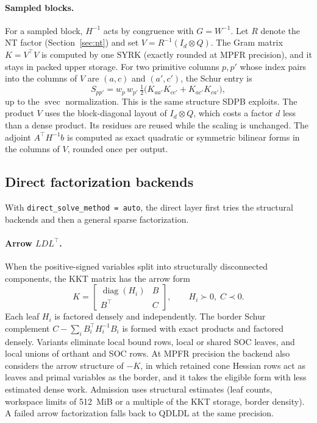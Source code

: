 \documentclass[11pt]{article}
\newcommand{\svec}{\operatorname{svec}}
\newcommand{\code}[1]{\texttt{#1}}
\begin{document}
\paragraph{Sampled blocks.}
For a sampled block, $H^{-1}$ acts by congruence with $G = W^{-1}$. Let $R$
denote the NT factor (Section~\ref{sec:nt}) and set
$V = R^{-1}(I_d\otimes Q)$. The Gram matrix $K = V^\top V$ is computed by one
SYRK (exactly rounded at MPFR precision), and it stays in packed upper storage.
For two primitive columns $p, p'$ whose index pairs into the columns of $V$
are $(a,c)$ and $(a',c')$, the Schur entry is
\begin{equation}
  S_{pp'} = w_p\,w_{p'}\,\tfrac12\bigl(K_{aa'}K_{cc'} + K_{ac'}K_{ca'}\bigr),
\end{equation}
up to the $\svec$ normalization. This is the same structure SDPB exploits. The
product $V$ uses the block-diagonal layout of $I_d\otimes Q$, which costs a
factor $d$ less than a dense product. Its residues are reused while the
scaling is unchanged. The adjoint $A^\top H^{-1}b$ is computed as exact
quadratic or symmetric bilinear forms in the columns of $V$, rounded once per
output.

\subsection{Direct factorization backends}

With \code{direct\_solve\_method = auto}, the direct layer first tries the
structural backends and then a general sparse factorization.

\paragraph{Arrow $LDL^\top$.}
When the positive-signed variables split into structurally disconnected
components, the KKT matrix has the arrow form
\begin{equation}
  K = \begin{bmatrix} \operatorname{diag}(H_i) & B \\ B^\top & C \end{bmatrix},
  \qquad H_i \succ 0,\; C \prec 0 .
\end{equation}
Each leaf $H_i$ is factored densely and independently. The border Schur
complement $C - \sum_i B_i^\top H_i^{-1} B_i$ is formed with exact products
and factored densely. Variants eliminate local bound rows, local or shared SOC
leaves, and local unions of orthant and SOC rows. At MPFR precision the
backend also considers the arrow structure of $-K$, in which retained cone
Hessian rows act as leaves and primal variables as the border, and it takes
the eligible form with less estimated dense work. Admission uses structural
estimates (leaf counts, workspace limits of 512~MiB or a multiple of the KKT
storage, border density). A failed arrow factorization falls back to QDLDL at
the same precision.
\end{document}
